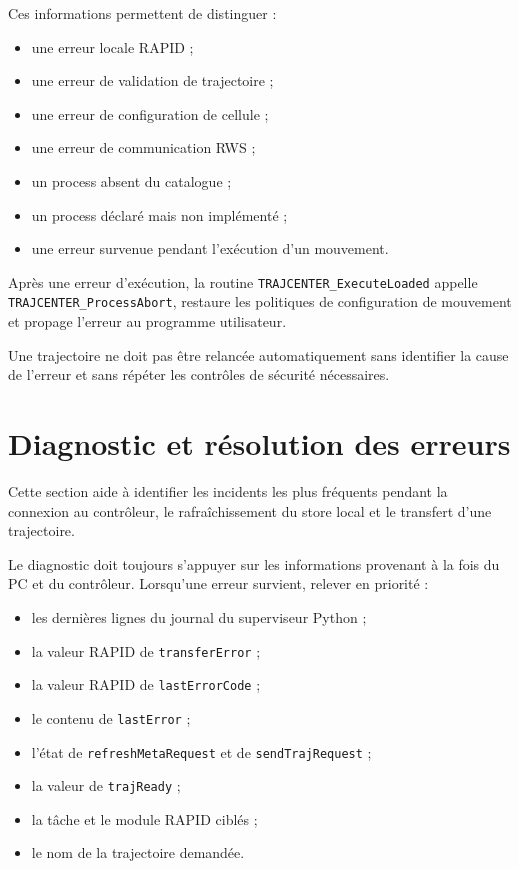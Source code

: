 \documentclass{rapportENSAM}
\begin{document}
Ces informations permettent de distinguer :

\begin{itemize}
    \item une erreur locale RAPID ;
    \item une erreur de validation de trajectoire ;
    \item une erreur de configuration de cellule ;
    \item une erreur de communication RWS ;
    \item un process absent du catalogue ;
    \item un process déclaré mais non implémenté ;
    \item une erreur survenue pendant l'exécution d'un mouvement.
\end{itemize}

Après une erreur d'exécution, la routine \texttt{TRAJCENTER\_ExecuteLoaded} appelle
\texttt{TRAJCENTER\_ProcessAbort}, restaure les politiques de configuration
de mouvement et propage l'erreur au programme utilisateur.

Une trajectoire ne doit pas être relancée automatiquement sans identifier la
cause de l'erreur et sans répéter les contrôles de sécurité nécessaires.

\FloatBarrier


\section{Diagnostic et résolution des erreurs}
\label{sec:diagnostic}

Cette section aide à identifier les incidents les plus fréquents pendant la
connexion au contrôleur, le rafraîchissement du store local et le transfert
d'une trajectoire.

Le diagnostic doit toujours s'appuyer sur les informations provenant à la fois
du PC et du contrôleur. Lorsqu'une erreur survient, relever en priorité :

\begin{itemize}
    \item les dernières lignes du journal du superviseur Python ;
    \item la valeur RAPID de \texttt{transferError} ;
    \item la valeur RAPID de \texttt{lastErrorCode} ;
    \item le contenu de \texttt{lastError} ;
    \item l'état de \texttt{refreshMetaRequest} et de
    \texttt{sendTrajRequest} ;
    \item la valeur de \texttt{trajReady} ;
    \item la tâche et le module RAPID ciblés ;
    \item le nom de la trajectoire demandée.
\end{itemize}
\end{document}
